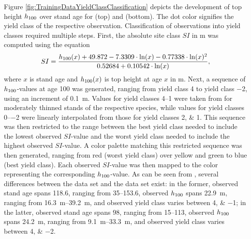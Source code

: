 Figure \ref{fig:TrainingDataYieldClassClassification} depicts the development of top height \(h_{100}\) over stand age for \Beech{} (top) and \Spruce{} (bottom).  The dot color signifies the yield class of the respective observation.  Classification of observations into yield classes required multiple steps.  First, the absolute site class \(SI\) in \si{\meter} was computed using the equation
\begin{equation}
  \label{eq:NagelFunctionSolvedForSI}
  SI = \frac{h_{100}(x) + 49.872 - 7.3309 \cdot \ln(x) - 0.77338 \cdot \ln(x)^2 }{0.52684 + 0.10542 \cdot \ln(x)} ,
\end{equation}
\parencite{Nagel} where \(x\) is stand age and \(h_{100}(x)\) is top height at age \(x\) in \si{\meter}.  Next, a sequence of \(h_{100}{}\)-values at age \SI{100}{\years} was generated, ranging from yield class \num{4} to yield class \num{-2}, using an increment of \SI{0.1}{\meter}.  Values for yield classes \numrange{4}{1} were taken from \textcite{Schober1995} for moderately thinned stands of the respective species, while values for yield classes \numrange{0}{-2} were linearly interpolated from those for yield classes \numlist{2; 1}.  This sequence was then restricted to the range between the best yield class needed to include the lowest observed \(SI\)-value and the worst yield class needed to include the highest observed \(SI\)-value.  A color palette matching this restricted sequence was then generated, ranging from red (worst yield class) over yellow and green to blue (best yield class).  Each observed \(SI\)-value was then mapped to the color representing the corresponding \(h_{100}{}\)-value.  As can be seen from , several differences between the \Beech{} data set and the \Spruce{} data set exist:
in the former, observed stand age spans \SI{118.6}{\years}, ranging from \SIrange{35}{153.6}{\years}, observed \(h_{100}{}\) spans \SI{22.9}{\meter}, ranging from \SIrange{16.3}{39.2}{\meter}, and observed yield class varies between \numlist{4; -1};
in the latter, observed stand age spans \SI{98}{\years}, ranging from \SIrange{15}{113}{\years}, observed \(h_{100}{}\) spans \SI{24.2}{\meter}, ranging from \SIrange{9.1}{33.3}{\meter}, and observed yield class varies between \numlist{4; -2}.

